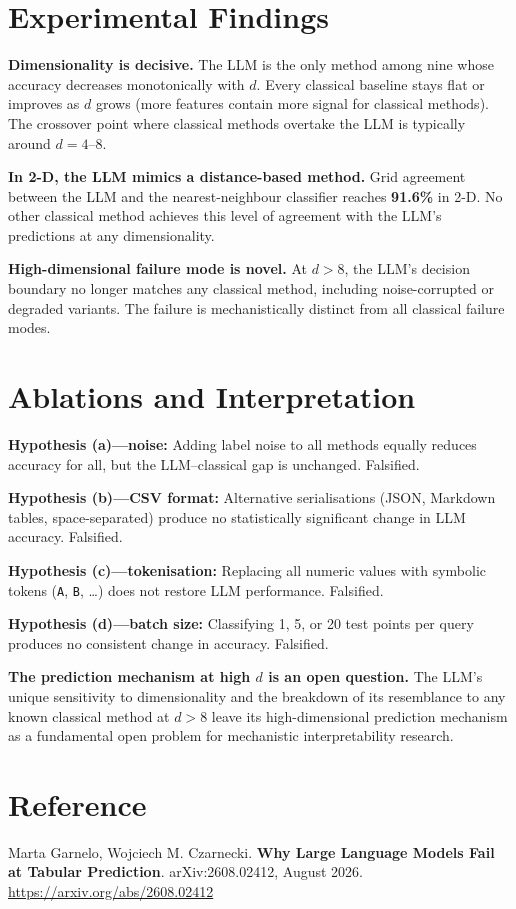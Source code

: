 \documentclass[10pt,twocolumn]{article}
\begin{document}
\section{Experimental Findings}

\textbf{Dimensionality is decisive.}
The LLM is the only method among nine whose accuracy decreases monotonically with
$d$. Every classical baseline stays flat or improves as $d$ grows (more features
contain more signal for classical methods). The crossover point where classical
methods overtake the LLM is typically around $d = 4$--8.

\textbf{In 2-D, the LLM mimics a distance-based method.}
Grid agreement between the LLM and the nearest-neighbour classifier reaches
\textbf{91.6\%} in 2-D. No other classical method achieves this level of
agreement with the LLM's predictions at any dimensionality.

\textbf{High-dimensional failure mode is novel.}
At $d > 8$, the LLM's decision boundary no longer matches any classical method,
including noise-corrupted or degraded variants. The failure is mechanistically
distinct from all classical failure modes.

\section{Ablations and Interpretation}

\textbf{Hypothesis (a)---noise:} Adding label noise to all methods equally
reduces accuracy for all, but the LLM--classical gap is unchanged. Falsified.

\textbf{Hypothesis (b)---CSV format:} Alternative serialisations (JSON, Markdown
tables, space-separated) produce no statistically significant change in LLM accuracy.
Falsified.

\textbf{Hypothesis (c)---tokenisation:} Replacing all numeric values with symbolic
tokens (\texttt{A}, \texttt{B}, \ldots) does not restore LLM performance.
Falsified.

\textbf{Hypothesis (d)---batch size:} Classifying 1, 5, or 20 test points per
query produces no consistent change in accuracy. Falsified.

\textbf{The prediction mechanism at high $d$ is an open question.}
The LLM's unique sensitivity to dimensionality and the breakdown of its resemblance
to any known classical method at $d > 8$ leave its high-dimensional prediction
mechanism as a fundamental open problem for mechanistic interpretability research.

\section*{Reference}

Marta Garnelo, Wojciech M. Czarnecki. \textbf{Why Large Language Models Fail at
Tabular Prediction}. arXiv:2608.02412, August 2026.
\url{https://arxiv.org/abs/2608.02412}
\end{document}
